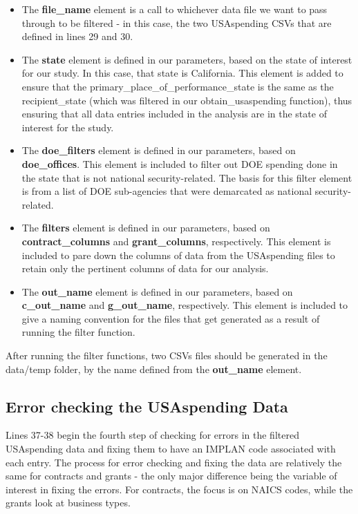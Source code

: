 \documentclass[
]{book}
\providecommand{\tightlist}{%
  \setlength{\itemsep}{0pt}\setlength{\parskip}{0pt}}
\begin{document}
\begin{itemize}
\tightlist
\item
  The \textbf{file\_name} element is a call to whichever data file we want to pass through to be filtered - in this case, the two USAspending CSVs that are defined in lines 29 and 30.
\item
  The \textbf{state} element is defined in our parameters, based on the state of interest for our study. In this case, that state is California. This element is added to ensure that the primary\_place\_of\_performance\_state is the same as the recipient\_state (which was filtered in our obtain\_usaspending function), thus ensuring that all data entries included in the analysis are in the state of interest for the study.
\item
  The \textbf{doe\_filters} element is defined in our parameters, based on \textbf{doe\_offices}. This element is included to filter out DOE spending done in the state that is not national security-related. The basis for this filter element is from a list of DOE sub-agencies that were demarcated as national security-related.
\item
  The \textbf{filters} element is defined in our parameters, based on \textbf{contract\_columns} and \textbf{grant\_columns}, respectively. This element is included to pare down the columns of data from the USAspending files to retain only the pertinent columns of data for our analysis.
\item
  The \textbf{out\_name} element is defined in our parameters, based on \textbf{c\_out\_name} and \textbf{g\_out\_name}, respectively. This element is included to give a naming convention for the files that get generated as a result of running the filter function.
\end{itemize}

After running the filter functions, two CSVs files should be generated in the data/temp folder, by the name defined from the \textbf{out\_name} element.

\hypertarget{error-checking-the-usaspending-data}{%
\subsection{Error checking the USAspending Data}\label{error-checking-the-usaspending-data}}

Lines 37-38 begin the fourth step of checking for errors in the filtered USAspending data and fixing them to have an IMPLAN code associated with each entry. The process for error checking and fixing the data are relatively the same for contracts and grants - the only major difference being the variable of interest in fixing the errors. For contracts, the focus is on NAICS codes, while the grants look at business types.
\end{document}
